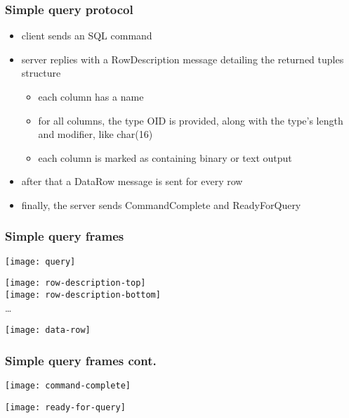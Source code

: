 \documentclass{beamer}
\begin{document}
\begin{frame}
  \frametitle{Simple query protocol}

  \begin{itemize}
  \item client sends an SQL command
  \item server replies with a RowDescription message detailing the returned
    tuples structure
    \begin{itemize}
    \item each column has a name
    \item for all columns, the type OID is provided, along with the type's
      length and modifier, like char(16)
    \item each column is marked as containing binary or text output
    \end{itemize}
  \item after that a DataRow message is sent for every row
  \item finally, the server sends CommandComplete and ReadyForQuery
  \end{itemize}
\end{frame}

\begin{frame}
  \frametitle{Simple query frames}

  \begin{center}
    \texttt{[image: query]}
  \end{center}

  \bigskip

  \hspace{0.4cm}\texttt{[image: row-description-top]}\;\raisebox{0.2cm}{$+$} \\
  \hspace{0.4cm}\texttt{[image: row-description-bottom]} \\
  \hspace{0.4cm}\dots

  \bigskip

  \begin{center}
    \texttt{[image: data-row]}
  \end{center}

\end{frame}

\begin{frame}
  \frametitle{Simple query frames cont.}

  \begin{center}
    \texttt{[image: command-complete]}
  \end{center}

  \bigskip

  \begin{center}
    \texttt{[image: ready-for-query]}
  \end{center}

\end{frame}
\end{document}
